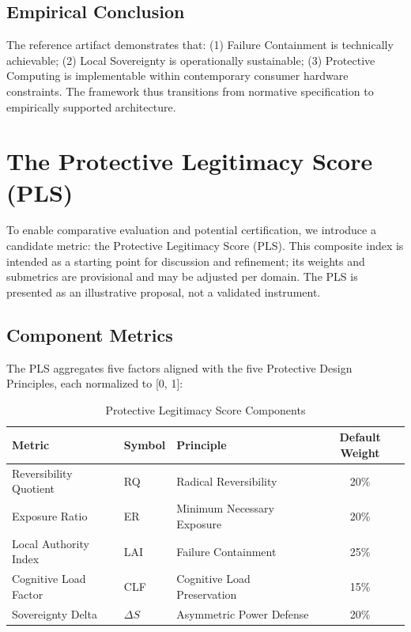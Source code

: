 \documentclass[acmsmall,review]{acmart}
\begin{document}
\subsection{Empirical Conclusion}

The reference artifact demonstrates that: (1) Failure Containment is technically achievable; (2) Local Sovereignty is operationally sustainable; (3) Protective Computing is implementable within contemporary consumer hardware constraints. The framework thus transitions from normative specification to empirically supported architecture.

\section{The Protective Legitimacy Score (PLS)}

To enable comparative evaluation and potential certification, we introduce a candidate metric: the Protective Legitimacy Score (PLS). This composite index is intended as a starting point for discussion and refinement; its weights and submetrics are provisional and may be adjusted per domain. The PLS is presented as an illustrative proposal, not a validated instrument.

\subsection{Component Metrics}

The PLS aggregates five factors aligned with the five Protective Design Principles, each normalized to [0, 1]:

\begin{table}[h]
\centering
\caption{Protective Legitimacy Score Components}
\label{tab:pls-components}
\begin{tabular}{lllc}
\toprule
\textbf{Metric} & \textbf{Symbol} & \textbf{Principle} & \textbf{Default Weight} \\
\midrule
Reversibility Quotient & RQ & Radical Reversibility & 20\% \\
Exposure Ratio & ER & Minimum Necessary Exposure & 20\% \\
Local Authority Index & LAI & Failure Containment & 25\% \\
Cognitive Load Factor & CLF & Cognitive Load Preservation & 15\% \\
Sovereignty Delta & $\Delta S$ & Asymmetric Power Defense & 20\% \\
\bottomrule
\end{tabular}
\end{table}
\end{document}
